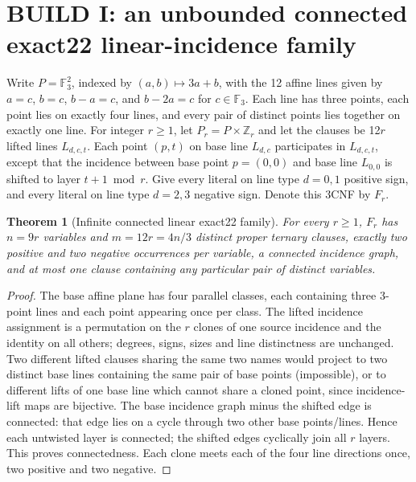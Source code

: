 \documentclass[10pt]{article}
\newtheorem{theorem}{Theorem}
\begin{document}
\section{BUILD I: an unbounded connected exact22 linear-incidence family}
Write $P=\mathbb F_3^2$, indexed by $(a,b)\mapsto3a+b$, with the 12 affine lines given by $a=c$, $b=c$, $b-a=c$, and $b-2a=c$ for $c\in\mathbb F_3$. Each line has three points, each point lies on exactly four lines, and every pair of distinct points lies together on exactly one line. For integer $r\ge1$, let $P_r=P\times\mathbb Z_r$ and let the clauses be 12$r$ lifted lines $L_{d,c,t}$. Each point $(p,t)$ on base line $L_{d,c}$ participates in $L_{d,c,t}$, except that the incidence between base point $p=(0,0)$ and base line $L_{0,0}$ is shifted to layer $t+1\bmod r$. Give every literal on line type $d=0,1$ positive sign, and every literal on line type $d=2,3$ negative sign. Denote this 3CNF by $F_r$.
\begin{theorem}[Infinite connected linear exact22 family]\label{th:design}
For every $r\ge1$, $F_r$ has $n=9r$ variables and $m=12r=4n/3$ distinct proper ternary clauses, exactly two positive and two negative occurrences per variable, a connected incidence graph, and at most one clause containing any particular pair of distinct variables.
\end{theorem}
\begin{proof}
The base affine plane has four parallel classes, each containing three 3-point lines and each point appearing once per class. The lifted incidence assignment is a permutation on the $r$ clones of one source incidence and the identity on all others; degrees, signs, sizes and line distinctness are unchanged. Two different lifted clauses sharing the same two names would project to two distinct base lines containing the same pair of base points (impossible), or to different lifts of one base line which cannot share a cloned point, since incidence-lift maps are bijective. The base incidence graph minus the shifted edge is connected: that edge lies on a cycle through two other base points/lines. Hence each untwisted layer is connected; the shifted edges cyclically join all $r$ layers. This proves connectedness. Each clone meets each of the four line directions once, two positive and two negative.
\end{proof}
\end{document}
